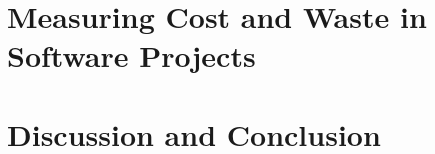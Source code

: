 \documentclass[11pt,english,twocolumn]{article}
\begin{document}
\section{Measuring Cost and Waste in Software Projects}
\label{sec:measuring-waste}

\section{Discussion and Conclusion}
\label{sec:conclusion}

\let\oldbibliography\thebibliography
\renewcommand{\thebibliography}[1]{\oldbibliography{#1}
\setlength{\itemsep}{-3pt}}


{
\scriptsize

}
\end{document}

